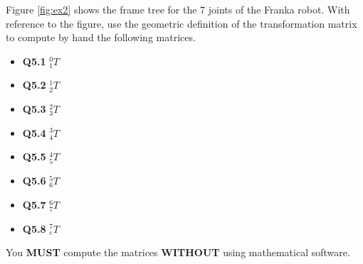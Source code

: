 Figure \ref{fig:ex2} shows the frame tree for the 7 joints of the Franka robot. With reference to the figure, use the geometric definition of the transformation matrix to compute by hand the following matrices.
\begin{itemize}
\item \textbf{Q5.1} \hspace{10mm} $^0_1 T$
\item \textbf{Q5.2} \hspace{10mm} $^1_2 T$
\item \textbf{Q5.3} \hspace{10mm} $^2_3 T$
\item \textbf{Q5.4} \hspace{10mm} $^3_4 T$
\item \textbf{Q5.5} \hspace{10mm} $^4_5 T$
\item \textbf{Q5.6} \hspace{10mm} $^5_6 T$
\item \textbf{Q5.7} \hspace{10mm} $^6_7 T$
\item \textbf{Q5.8} \hspace{10mm} $^7_e T$
\end{itemize}

You \textbf{MUST} compute the matrices \textbf{WITHOUT} using mathematical software.

\newpage